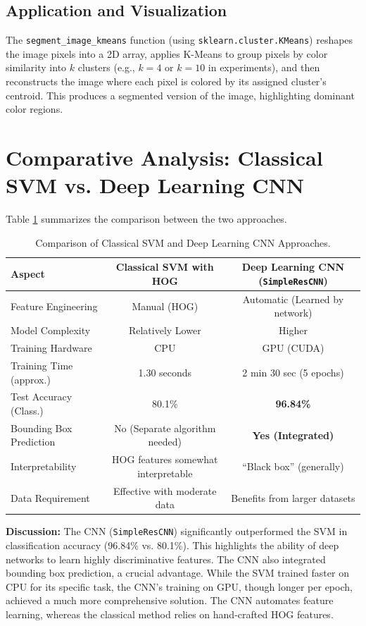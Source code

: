 \documentclass[11pt, a4paper]{article}
\begin{document}
\subsection{Application and Visualization}
The \texttt{segment\_image\_kmeans} function (using \texttt{sklearn.cluster.KMeans}) reshapes the image pixels into a 2D array, applies K-Means to group pixels by color similarity into $k$ clusters (e.g., $k=4$ or $k=10$ in experiments), and then reconstructs the image where each pixel is colored by its assigned cluster's centroid. This produces a segmented version of the image, highlighting dominant color regions.

\section{Comparative Analysis: Classical SVM vs. Deep Learning CNN}
Table \ref{tab:comparison} summarizes the comparison between the two approaches.

\begin{table}[h!]
    \centering
    \caption{Comparison of Classical SVM and Deep Learning CNN Approaches.}
    \label{tab:comparison}
    \begin{tabular}{@{}lcc@{}}
        \toprule
        \textbf{Aspect} & \textbf{Classical SVM with HOG} & \textbf{Deep Learning CNN (\texttt{SimpleResCNN})} \\
        \midrule
        Feature Engineering & Manual (HOG) & Automatic (Learned by network) \\
        Model Complexity & Relatively Lower & Higher \\
        Training Hardware & CPU & GPU (CUDA) \\
        Training Time (approx.) & 1.30 seconds & 2 min 30 sec (5 epochs) \\
        Test Accuracy (Class.) & 80.1\% & \textbf{96.84\%} \\
        Bounding Box Prediction & No (Separate algorithm needed) & \textbf{Yes (Integrated)} \\
        Interpretability & HOG features somewhat interpretable & ``Black box'' (generally) \\
        Data Requirement & Effective with moderate data & Benefits from larger datasets \\
        \bottomrule
    \end{tabular}
\end{table}

\textbf{Discussion:}
The CNN (\texttt{SimpleResCNN}) significantly outperformed the SVM in classification accuracy (96.84\% vs. 80.1\%). This highlights the ability of deep networks to learn highly discriminative features. The CNN also integrated bounding box prediction, a crucial advantage. While the SVM trained faster on CPU for its specific task, the CNN's training on GPU, though longer per epoch, achieved a much more comprehensive solution. The CNN automates feature learning, whereas the classical method relies on hand-crafted HOG features.
\end{document}
